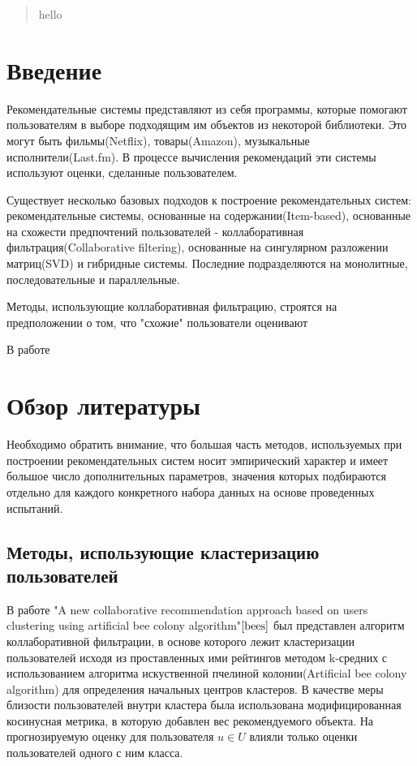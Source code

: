 \documentclass[12pt]{article} %
\begin{document}
\begin{abstract}
hello
\end{abstract}

\section{Введение}
\par Рекомендательные системы представляют из себя программы, которые помогают пользователям в выборе подходящим им объектов из некоторой библиотеки.  %
Это могут быть фильмы(Netflix), товары(Amazon), музыкальные исполнители(Last.fm). В процессе вычисления рекомендаций эти системы используют оценки, сделанные пользователем. 

Существует несколько базовых подходов к построение рекомендательных систем: рекомендательные системы, основанные на содержании(Item-based), основанные на схожести предпочтений пользователей - коллаборативная фильтрация(Collaborative filtering), основанные на сингулярном разложении матриц(SVD) и гибридные системы. Последние подразделяются на монолитные, последовательные и параллельные.



Методы, использующие коллаборативная фильтрацию, строятся на предположении о том, что "схожие" пользователи оценивают 


В работе 




\section{Обзор литературы}
Необходимо обратить внимание, что большая часть методов, используемых при построении рекомендательных систем носит эмпирический характер и имеет большое число дополнительных параметров, значения которых подбираются отдельно для каждого конкретного набора данных на основе проведенных испытаний.
\subsection{Методы, использующие кластеризацию пользователей}
\par
В работе "A new collaborative recommendation approach based on users clustering using artificial bee colony algorithm"$\cite{bees}$ был представлен алгоритм коллаборативной фильтрации, в основе которого лежит кластеризации пользователей исходя из проставленных ими рейтингов методом k-средних с использованием алгоритма искуственной пчелиной колонии(Artificial bee colony algorithm) для определения начальных центров кластеров. В качестве меры близости пользователей внутри кластера была использована модифицированная косинусная метрика, в которую добавлен вес рекомендуемого объекта. На прогнозируемую оценку для пользователя $u \in U$  влияли только оценки пользователей одного с ним класса. 
\end{document}
